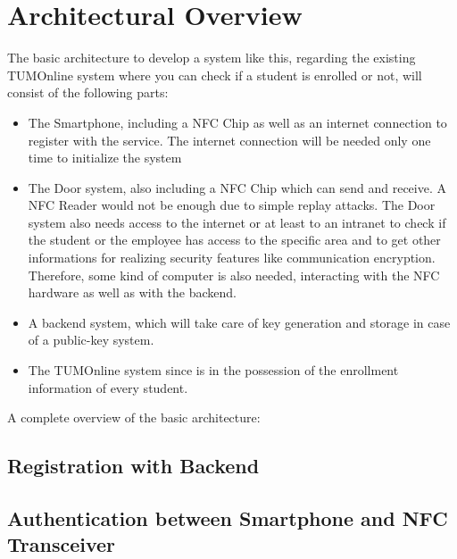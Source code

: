 \section{Architectural Overview}\label{sec:arch}

The basic architecture to develop a system like this, regarding the existing TUMOnline system where you can check if a student is enrolled or not, will consist of the following parts:

\begin{itemize}
\item The Smartphone, including a NFC Chip as well as an internet connection to register with the service. The internet connection will be needed only one time to initialize the system
\item The Door system, also including a NFC Chip which can send and receive. A NFC Reader would not be enough due to simple replay attacks. The Door system also needs access to the internet or at least to an intranet to check if the student or the employee has access to the specific area and to get other informations for realizing security features like communication encryption. Therefore, some kind of computer is also needed, interacting with the NFC hardware as well as with the backend.
\item A backend system, which will take care of key generation and storage in case of a public-key system.

\item The TUMOnline system since is in the possession of the enrollment information of every student.
\end{itemize} 
 
 A complete overview of the basic architecture: \newline
 \begin{center}
\end{center}


\subsection{Registration with Backend}

\subsection{Authentication between Smartphone and NFC Transceiver}